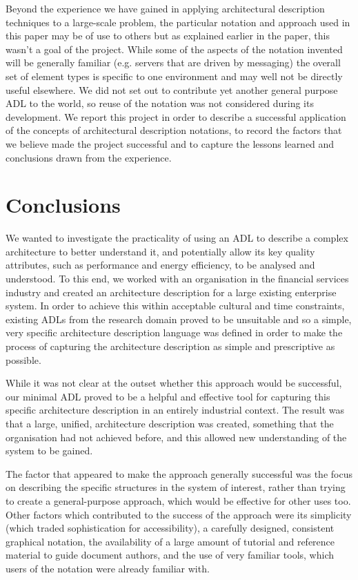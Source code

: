   Beyond the experience we have gained in applying architectural description techniques to a large-scale problem, the particular notation and approach used in this paper may be of use to others but as explained earlier in the paper, this wasn't a goal of the project. While some of the aspects of the notation invented will be generally familiar (e.g. servers that are driven by messaging) the overall set of element types is specific to one environment and may well not be directly useful elsewhere.  We did not set out to contribute yet another general purpose ADL to the world, so reuse of the notation was not considered during its development.  We report this project in order to describe a successful application of the concepts of architectural description notations, to record the factors that we believe made the project successful and to capture the lessons learned and conclusions drawn from the experience.

\section{Conclusions}

  We wanted to investigate the practicality of using an ADL to describe a complex architecture to better understand it, and potentially allow its key quality attributes, such as performance and energy efficiency, to be analysed and understood.  To this end, we worked with an organisation in the financial services industry and created an architecture description for a large existing enterprise system.  In order to achieve this within acceptable cultural and time constraints, existing ADLs from the research domain proved to be unsuitable and so a simple, very specific architecture description language was defined in order to make the process of capturing the architecture description as simple and prescriptive as possible.

  While it was not clear at the outset whether this approach would be successful, our minimal ADL proved to be a helpful and effective tool for capturing this specific architecture description in an entirely industrial context.  The result was that a large, unified, architecture description was created, something that the organisation had not achieved before, and this allowed new understanding of the system to be gained.

  The factor that appeared to make the approach generally successful was the focus on describing the specific structures in the system of interest, rather than trying to create a general-purpose approach, which would be effective for other uses too.  Other factors which contributed to the success of the approach were its simplicity (which traded sophistication for accessibility), a carefully designed, consistent graphical notation, the availability of a large amount of tutorial and reference material to guide document authors, and the use of very familiar tools, which users of the notation were already familiar with.

